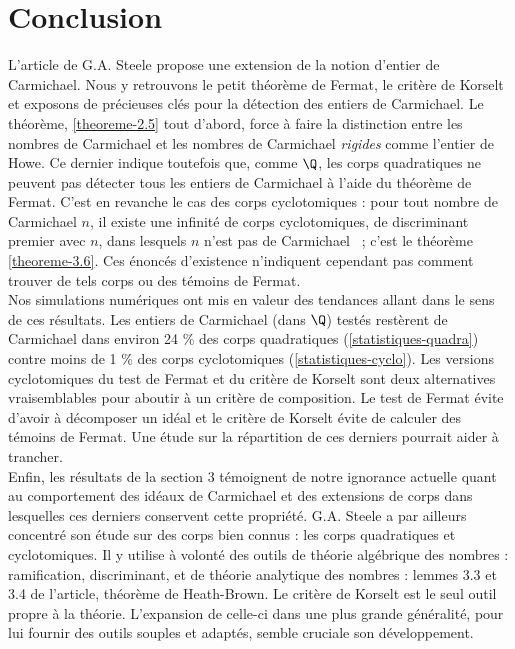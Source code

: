 \section*{Conclusion}

L'article de G.A. Steele propose une extension de la notion d'entier de Carmichael. Nous y retrouvons le petit théorème de Fermat, le critère de Korselt et exposons de précieuses clés pour la détection des entiers de Carmichael. Le théorème, \ref{theoreme-2.5} tout d'abord, force à faire la distinction entre les nombres de Carmichael et les nombres de Carmichael \emph{rigides} comme l'entier de Howe. Ce dernier indique toutefois que, comme $\Q$, les corps quadratiques ne peuvent pas détecter tous les entiers de Carmichael à l'aide du théorème de Fermat. C'est en revanche le cas des corps cyclotomiques : pour tout nombre de Carmichael $n$, il existe une infinité de corps cyclotomiques, de discriminant premier avec $n$, dans lesquels $n$ n'est pas de Carmichael ~; c'est le théorème \ref{theoreme-3.6}. Ces énoncés d'existence n'indiquent cependant pas comment trouver de tels corps ou des témoins de Fermat. \\

Nos simulations numériques ont mis en valeur des tendances allant dans le sens de ces résultats. Les entiers de Carmichael (dans $\Q$) testés restèrent de Carmichael dans environ 24 \% des corps quadratiques (\ref{statistiques-quadra}) contre moins de 1 \% des corps cyclotomiques (\ref{statistiques-cyclo}). Les versions cyclotomiques du test de Fermat et du critère de Korselt sont deux alternatives vraisemblables pour aboutir à un critère de composition. Le test de Fermat évite d'avoir à décomposer un idéal et le critère de Korselt évite de calculer des témoins de Fermat. Une étude sur la répartition de ces derniers pourrait aider à trancher. \\

Enfin, les résultats de la section 3 témoignent de notre ignorance actuelle quant au comportement des idéaux de Carmichael et des extensions de corps dans lesquelles ces derniers conservent cette propriété. G.A. Steele a par ailleurs concentré son étude sur des corps bien connus : les corps quadratiques et cyclotomiques. Il y utilise à volonté des outils de théorie algébrique des nombres : ramification, discriminant, et de théorie analytique des nombres : lemmes 3.3 et 3.4 de l'article, théorème de Heath-Brown. Le critère de Korselt est le seul outil propre à la théorie. L'expansion de celle-ci dans une plus grande généralité, pour lui fournir des outils souples et adaptés, semble cruciale son développement.
